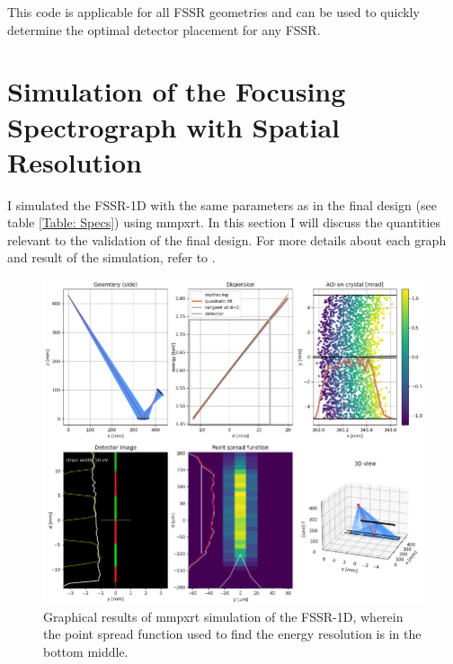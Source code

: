 This code is applicable for all FSSR geometries and can be used 
to quickly 
determine the optimal detector placement for any FSSR. 

\section{Simulation of the Focusing Spectrograph with 
Spatial Resolution}
\label{section: FSSR simulation}
I simulated the FSSR-1D with the same parameters as in the final 
design (see table \ref{Table: Specs}) using 
mmpxrt. In this section I will discuss the quantities relevant 
to the 
validation of the final design. For more details about each 
graph and result of 
the simulation, refer to \citep{vsmid2021x}. 

\begin{figure}[H]
	\centering
	\includegraphics[width=\textwidth]{Diagrams/FSSRmmpxrtGraphs.PNG}
	\caption{Graphical results of mmpxrt simulation 
	of the FSSR-1D, wherein the point 
		spread function used to find the energy 
		resolution is in the bottom middle.}
	\label{mmpxrtFSSRGraphs}
\end{figure}

